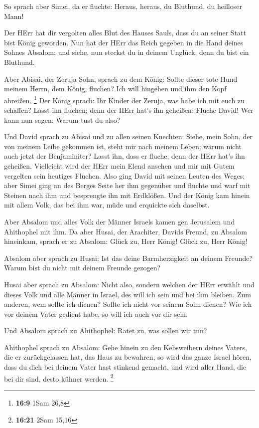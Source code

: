  So sprach aber Simei, da er fluchte: Heraus, heraus, du
Bluthund, du heilloser Mann!

 Der HErr hat dir vergolten alles Blut des Hauses Sauls,
dass du an seiner Statt bist König geworden. Nun hat der HErr das Reich
gegeben in die Hand deines Sohnes Absalom; und siehe, nun steckst du in
deinem Unglück; denn du bist ein Bluthund.

 Aber Abisai, der Zeruja Sohn, sprach zu dem König: Sollte
dieser tote Hund meinem Herrn, dem König, fluchen? Ich will hingehen und
ihm den Kopf abreißen. \footnote{\textbf{16:9} 1Sam 26,8} 
Der König sprach: Ihr Kinder der Zeruja, was habe ich mit euch zu
schaffen? Lasst ihn fluchen; denn der HErr hat's ihn geheißen: Fluche
David! Wer kann nun sagen: Warum tust du also?

 Und David sprach zu Abisai und zu allen seinen Knechten:
Siehe, mein Sohn, der von meinem Leibe gekommen ist, steht mir nach
meinem Leben; warum nicht auch jetzt der Benjaminiter? Lasst ihn, dass
er fluche; denn der HErr hat's ihn geheißen.  Vielleicht
wird der HErr mein Elend ansehen und mir mit Gutem vergelten sein
heutiges Fluchen.  Also ging David mit seinen Leuten des
Weges; aber Simei ging an des Berges Seite her ihm gegenüber und fluchte
und warf mit Steinen nach ihm und besprengte ihn mit Erdklößen.
 Und der König kam hinein mit allem Volk, das bei ihm war,
müde und erquickte sich daselbst.

 Aber Absalom und alles Volk der Männer Israels kamen gen
Jerusalem und Ahithophel mit ihm.  Da aber Husai, der
Arachiter, Davids Freund, zu Absalom hineinkam, sprach er zu Absalom:
Glück zu, Herr König! Glück zu, Herr König!

 Absalom aber sprach zu Husai: Ist das deine Barmherzigkeit
an deinem Freunde? Warum bist du nicht mit deinem Freunde gezogen?

 Husai aber sprach zu Absalom: Nicht also, sondern welchen
der HErr erwählt und dieses Volk und alle Männer in Israel, des will ich
sein und bei ihm bleiben.  Zum anderen, wem sollte ich
dienen? Sollte ich nicht vor seinem Sohn dienen? Wie ich vor deinem
Vater gedient habe, so will ich auch vor dir sein.

 Und Absalom sprach zu Ahithophel: Ratet zu, was sollen wir
tun?

 Ahithophel sprach zu Absalom: Gehe hinein zu den
Kebsweibern deines Vaters, die er zurückgelassen hat, das Haus zu
bewahren, so wird das ganze Israel hören, dass du dich bei deinem Vater
hast stinkend gemacht, und wird aller Hand, die bei dir sind, desto
kühner werden. \footnote{\textbf{16:21} 2Sam 15,16}

